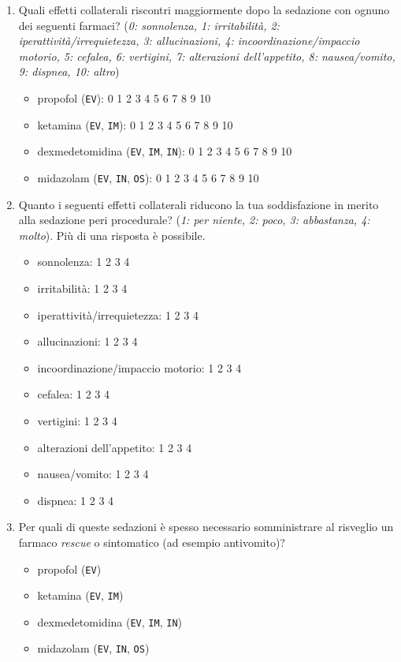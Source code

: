\begin{enumerate}
           \item Quali effetti collaterali riscontri maggiormente dopo la sedazione con ognuno dei seguenti farmaci? (\emph{0: sonnolenza, 1: irritabilità, 2: iperattività/irrequietezza, 3: allucinazioni, 4: incoordinazione/impaccio motorio, 5: cefalea, 6: vertigini, 7: alterazioni dell’appetito, 8: nausea/vomito, 9: dispnea, 10: altro})
           \begin{itemize}
               \item propofol (\texttt{EV}): 0 1 2 3 4 5 6 7 8 9 10
               \item ketamina (\texttt{EV}, \texttt{IM}): 0 1 2 3 4 5 6 7 8 9 10
               \item dexmedetomidina (\texttt{EV}, \texttt{IM}, \texttt{IN}): 0 1 2 3 4 5 6 7 8 9 10
               \item midazolam (\texttt{EV}, \texttt{IN}, \texttt{OS}): 0 1 2 3 4 5 6 7 8 9 10
           \end{itemize}
           
           \item Quanto i seguenti effetti collaterali riducono la tua soddisfazione in merito alla sedazione peri procedurale? (\emph{1: per niente, 2: poco, 3: abbastanza, 4: molto}). Più di una risposta è possibile. 
           \begin{itemize}
               \item sonnolenza:     1 2 3 4
               \item irritabilità:   1 2 3 4
               \item iperattività/irrequietezza: 1 2 3 4
               \item allucinazioni: 1 2 3 4
               \item incoordinazione/impaccio motorio: 1 2 3 4
               \item cefalea: 1 2 3 4
               \item vertigini: 1 2 3 4
               \item alterazioni dell’appetito: 1 2 3 4
               \item nausea/vomito: 1 2 3 4
               \item dispnea: 1 2 3 4
           \end{itemize}
           
           \item Per quali di queste sedazioni è spesso necessario somministrare al risveglio un farmaco \emph{rescue} o sintomatico (ad esempio antivomito)?
           \begin{itemize}
               \item propofol (\texttt{EV})
               \item ketamina (\texttt{EV}, \texttt{IM})
               \item dexmedetomidina (\texttt{EV}, \texttt{IM}, \texttt{IN})
               \item midazolam (\texttt{EV}, \texttt{IN}, \texttt{OS})
           \end{itemize}
           

\end{enumerate}
